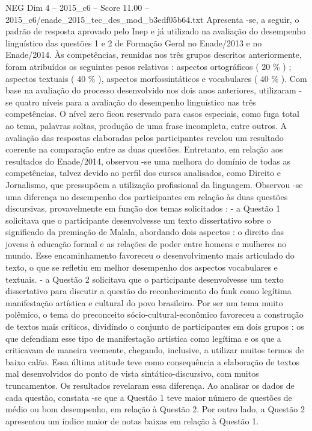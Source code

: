 \begin{textsample}{NEG Dim 4 – 2015\_c6 – Score 11.00 – 2015\_c6/enade\_2015\_tec\_des\_mod\_b3edf05b64.txt}
Apresenta -se, a seguir, o padrão de resposta aprovado pelo Inep e já utilizado na avaliação do desempenho linguístico das questões 1 e 2 de Formação Geral no Enade/2013 e no Enade/2014.
Às competências, reunidas nos três grupos descritos anteriormente, foram atribuídos os seguintes pesos relativos : aspectos ortográficos ( 20 \% ) ; aspectos textuais ( 40 \% ), aspectos morfossintáticos e vocabulares ( 40 \% ).
Com base na avaliação do processo desenvolvido nos dois anos anteriores, utilizaram -se quatro níveis para a avaliação do desempenho linguístico nas três competências.
O nível zero ficou reservado para casos especiais, como fuga total ao tema, palavras soltas, produção de uma frase incompleta, entre outros.
A avaliação das respostas elaboradas pelos participantes revelou um resultado coerente na comparação entre as duas questões.
Entretanto, em relação aos resultados do Enade/2014, observou -se uma melhora do domínio de todas as competências, talvez devido ao perfil dos cursos analisados, como Direito e Jornalismo, que pressupõem a utilização profissional da linguagem.
Observou -se uma diferença no desempenho dos participantes em relação às duas questões discursivas, provavelmente em função dos temas solicitados : - a Questão 1 solicitava que o participante desenvolvesse um texto dissertativo sobre o significado da premiação de Malala, abordando dois aspectos : o direito das jovens à educação formal e as relações de poder entre homens e mulheres no mundo.
Esse encaminhamento favoreceu o desenvolvimento mais articulado do texto, o que se refletiu em melhor desempenho dos aspectos vocabulares e textuais. - a Questão 2 solicitava que o participante desenvolvesse um texto dissertativo para discutir a questão do reconhecimento do funk como legítima manifestação artística e cultural do povo brasileiro.
Por ser um tema muito polêmico, o tema do preconceito sócio-cultural-econômico favoreceu a construção de textos mais críticos, dividindo o conjunto de participantes em dois grupos : os que defendiam esse tipo de manifestação artística como legítima e os que a criticavam de maneira veemente, chegando, inclusive, a utilizar muitos termos de baixo calão.
Essa última atitude teve como consequência a elaboração de textos mal desenvolvidos do ponto de vista sintático-discursivo, com muitos truncamentos.
Os resultados revelaram essa diferença.
Ao analisar os dados de cada questão, constata -se que a Questão 1 teve maior número de questões de médio ou bom desempenho, em relação à Questão 2.
Por outro lado, a Questão 2 apresentou um índice maior de notas baixas em relação à Questão 1.

\end{textsample}
